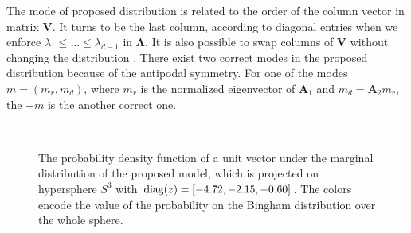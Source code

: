 \documentclass[micromachines,article,accept,pdftex,moreauthors]{Definitions/mdpi}
\begin{document}
The mode of proposed distribution is related to the order of the column vector in matrix $\boldsymbol{V}$. It turns to be the last column, according to diagonal entries when we enforce $\lambda_1 \leq \dots  \leq \lambda_{d-1}$  in $\boldsymbol{\Lambda}$. It is also possible to swap columns of $\boldsymbol{V}$ without changing the distribution \cite{kurzRecursiveBinghamFilter2014}. There exist two correct modes in the proposed distribution because of the antipodal symmetry.
For one of the modes $m = (m_r, m_d)$, where $m_r$ is the normalized eigenvector of $\boldsymbol{A}_1$ and $m_d =\boldsymbol{A}_2m_r$, the $-m$ is the another correct one.

\begin{figure}[H]
\centering
    ~
    ~
     ~
\caption{The probability density function of a unit vector under the marginal distribution of the proposed model, which is projected on hypersphere $S^{3}$ with ${\rm diag}(z)=[-4.72,  -2.15, -0.60]$. The colors encode the value of the probability on the Bingham distribution over the whole sphere.}
    \label{fig:bingham_projected}
\end{figure}  
\end{document}
